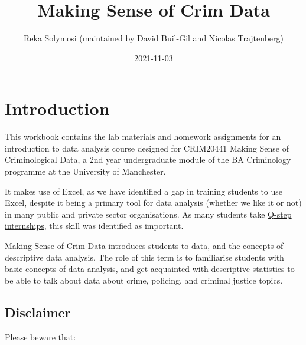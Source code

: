 \documentclass[
]{book}
\title{Making Sense of Crim Data}
\author{Reka Solymosi (maintained by David Buil-Gil and Nicolas Trajtenberg)}
\date{2021-11-03}
\begin{document}
\maketitle

{
\setcounter{tocdepth}{1}
\tableofcontents
}
\hypertarget{introduction}{%
\chapter*{Introduction}\label{introduction}}

This workbook contains the lab materials and homework assignments for an introduction to data analysis course designed for CRIM20441 Making Sense of Criminological Data, a 2nd year undergraduate module of the BA Criminology programme at the University of Manchester.

It makes use of Excel, as we have identified a gap in training students to use Excel, despite it being a primary tool for data analysis (whether we like it or not) in many public and private sector organisations. As many students take \href{https://www.humanities.manchester.ac.uk/q-step/}{Q-step internships}, this skill was identified as important.

Making Sense of Crim Data introduces students to data, and the concepts of descriptive data analysis. The role of this term is to familiarise students with basic concepts of data analysis, and get acquainted with descriptive statistics to be able to talk about data about crime, policing, and criminal justice topics.

\hypertarget{disclaimer}{%
\section*{Disclaimer}\label{disclaimer}}

Please beware that:
\end{document}
